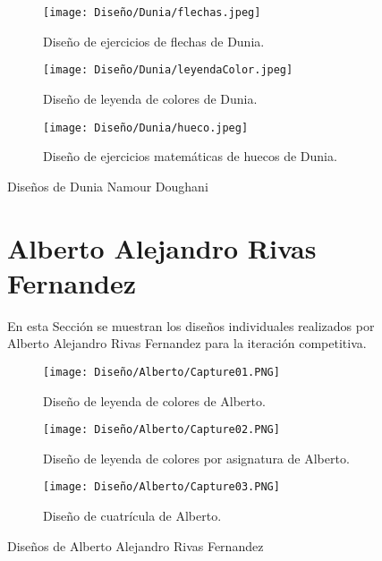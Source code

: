 \begin{figure}[ht!]
  \ContinuedFloat
  \begin{subfigure}{\textwidth}
    \centering
    \texttt{[image: Diseño/Dunia/flechas.jpeg]}
    \caption{Diseño de ejercicios de flechas de Dunia.}
    \label{dunia4}
  \end{subfigure}

  \begin{subfigure}{\textwidth}
    \centering
    \texttt{[image: Diseño/Dunia/leyendaColor.jpeg]}
    \caption{Diseño de leyenda de colores de Dunia.}
    \label{dunia5}
  \end{subfigure}

  \begin{subfigure}{\textwidth}
    \centering
    \texttt{[image: Diseño/Dunia/hueco.jpeg]}
    \caption{Diseño de ejercicios matemáticas de huecos de Dunia.}
    \label{dunia6}
  \end{subfigure}

  \caption{Diseños de Dunia Namour Doughani}
  \label{fig:disenyoDunia}
\end{figure}


\begin{figure}[ht!]
  \section{Alberto Alejandro Rivas Fernandez}
  En esta Sección se muestran los diseños individuales realizados por Alberto Alejandro Rivas Fernandez para la iteración competitiva.
  \label{sec:disenyoAlberto}
  \begin{subfigure}{\textwidth}
    \centering
    \texttt{[image: Diseño/Alberto/Capture01.PNG]}
    \caption{Diseño de leyenda de colores de Alberto.}
    \label{Alberto1}
  \end{subfigure}

  \begin{subfigure}{\textwidth}
    \centering
    \texttt{[image: Diseño/Alberto/Capture02.PNG]}
    \caption{Diseño de leyenda de colores por asignatura de Alberto.}
    \label{Alberto2}
  \end{subfigure}

  \begin{subfigure}{\textwidth}
    \centering
    \texttt{[image: Diseño/Alberto/Capture03.PNG]}
    \caption{Diseño de cuatrícula de Alberto.}
    \label{Alberto3}
  \end{subfigure}

  \caption{Diseños de Alberto Alejandro Rivas Fernandez}
  \label{fig:disenyoAlberto}
\end{figure}

